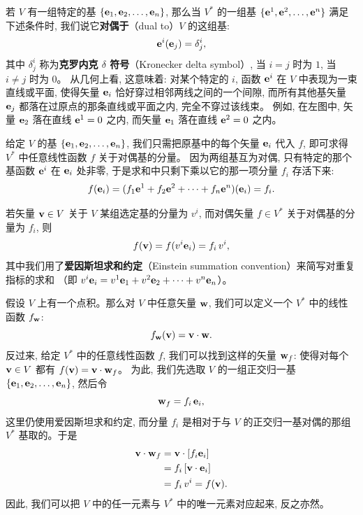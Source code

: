
若 $V$ 有一组特定的基 $\{\mathbf{e}_{1}, \mathbf{e}_{2}, \dots, \mathbf{e}_{n}\}$,
那么当 $V^{*}$ 的一组基 $\{\mathbf{e}^{1}, \mathbf{e}^{2}, \dots, \mathbf{e}^{n}\}$ 满足下述条件时,
我们说它\textbf{对偶于}（dual to）$V$ 的这组基:
\begin{equation}
\mathbf{e}^{i}(\mathbf{e}_{j}) = \delta^{i}_{j},
\end{equation}
其中 $\delta^{i}_{j}$ 称为\textbf{克罗内克 $\delta$ 符号}（Kronecker delta symbol）,
当 $i=j$ 时为 $1$, 当 $i \neq j$ 时为 $0$。
从几何上看, 这意味着: 对某个特定的 $i$, 函数 $\mathbf{e}^{i}$ 在 $V$ 中表现为一束直线或平面,
使得矢量 $\mathbf{e}_{i}$ 恰好穿过相邻两线之间的一个间隙,
而所有其他基矢量 $\mathbf{e}_{j}$ 都落在过原点的那条直线或平面之内, 完全不穿过该线束。
例如, 在左图中, 矢量 $\mathbf{e}_{2}$ 落在直线 $\mathbf{e}^{1}=0$ 之内, 而矢量 $\mathbf{e}_{1}$ 落在直线 $\mathbf{e}^{2}=0$ 之内。

给定 $V$ 的基 $\{\mathbf{e}_{1}, \mathbf{e}_{2}, \dots, \mathbf{e}_{n}\}$, 我们只需把原基中的每个矢量 $\mathbf{e}_{i}$ 代入 $f$,
即可求得 $V^{*}$ 中任意线性函数 $f$ 关于对偶基的分量。
因为两组基互为对偶, 只有特定的那个基函数 $\mathbf{e}^{i}$ 在 $\mathbf{e}_{i}$ 处非零,
于是求和中只剩下乘以它的那一项分量 $f_{i}$ 存活下来:
\begin{equation}
f(\mathbf{e}_{i}) = (f_{1}\mathbf{e}^{1} + f_{2}\mathbf{e}^{2} + \dots + f_{n}\mathbf{e}^{n})(\mathbf{e}_{i}) = f_{i}.
\end{equation}

若矢量 $\mathbf{v} \in V$ 关于 $V$ 某组选定基的分量为 $v^{i}$,
而对偶矢量 $f \in V^{*}$ 关于对偶基的分量为 $f_{i}$, 则
\begin{equation}
f(\mathbf{v}) = f(v^{i} \mathbf{e}_{i}) = f_{i}\, v^{i},
\end{equation}
其中我们用了\textbf{爱因斯坦求和约定}（Einstein summation convention）来简写对重复指标的求和
（即 $v^{i}\mathbf{e}_{i} = v^{1}\mathbf{e}_{1} + v^{2}\mathbf{e}_{2} + \dots + v^{n}\mathbf{e}_{n}$）。

假设 $V$ 上有一个点积。那么对 $V$ 中任意矢量 $\mathbf{w}$, 我们可以定义一个 $V^{*}$ 中的线性函数 $f_{\mathbf{w}}$:
\begin{equation}
f_{\mathbf{w}}(\mathbf{v}) = \mathbf{v} \cdot \mathbf{w}.
\end{equation}
反过来, 给定 $V^{*}$ 中的任意线性函数 $f$, 我们可以找到这样的矢量 $\mathbf{w}_{f}$:
使得对每个 $\mathbf{v} \in V$ 都有 $f(\mathbf{v}) = \mathbf{v} \cdot \mathbf{w}_{f}$。
为此, 我们先选取 $V$ 的一组正交归一基 $\{\mathbf{e}_{1}, \mathbf{e}_{2}, \dots, \mathbf{e}_{n}\}$, 然后令
\begin{equation}
\mathbf{w}_{f} = f_{i}\, \mathbf{e}_{i},
\end{equation}
这里仍使用爱因斯坦求和约定, 而分量 $f_{i}$ 是相对于与 $V$ 的正交归一基对偶的那组 $V^{*}$ 基取的。于是
\begin{align}
\mathbf{v} \cdot \mathbf{w}_{f}
&= \mathbf{v} \cdot [f_{i} \mathbf{e}_{i}] \\
&= f_{i}\,[\mathbf{v} \cdot \mathbf{e}_{i}] \\
&= f_{i}\, v^{i} = f(\mathbf{v}).
\end{align}
因此, 我们可以把 $V$ 中的任一元素与 $V^{*}$ 中的唯一元素对应起来, 反之亦然。

